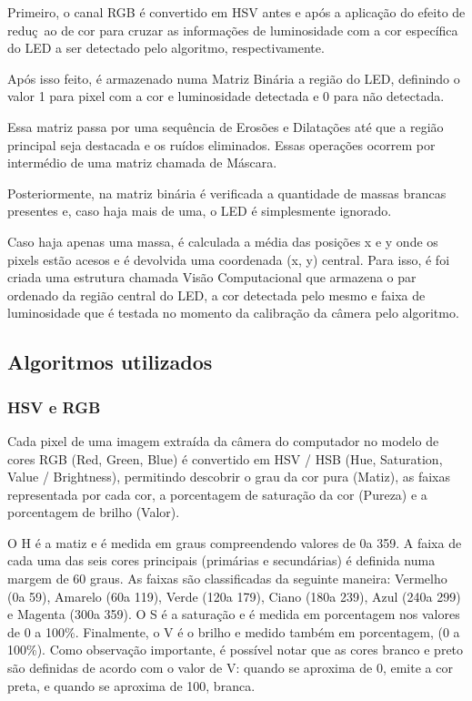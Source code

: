 \documentclass[12pt]{article}
\begin{document}
Primeiro, o canal RGB \'e convertido em HSV antes e ap\'os a aplica\c c\~ao do efeito de redu\c c~ao de cor para
cruzar as informa\c c\~oes de luminosidade com a cor espec\'ifica do LED a ser detectado pelo algoritmo, respectivamente.

Ap\'os isso feito, \'e armazenado numa Matriz Bin\'aria a regi\~ao do LED, definindo o valor 1 para pixel com
a cor e luminosidade detectada e 0 para n\~ao detectada.

Essa matriz passa por uma sequ\^encia de Eros\~oes e Dilata\c c\~oes at\'e que a regi\~ao principal seja destacada
e os ru\'idos eliminados. Essas opera\c c\~oes ocorrem por interm\'edio de uma matriz chamada de M\'ascara.

Posteriormente, na matriz bin\'aria \'e verificada a quantidade de massas brancas presentes e, caso haja mais de uma,
o LED \'e simplesmente ignorado.

Caso haja apenas uma massa, \'e calculada a m\'edia das posi\c c\~oes x e y onde os pixels est\~ao acesos e \'e devolvida
uma coordenada (x, y) central. Para isso, \'e foi criada uma estrutura chamada Vis\~ao Computacional que armazena
o par ordenado da regi\~ao central do LED, a cor detectada pelo mesmo e faixa de luminosidade que \'e testada no momento
da calibra\c c\~ao da c\^amera pelo algoritmo.

\subsection{Algoritmos utilizados\label{sec:alg}}

\subsubsection{HSV e RGB}
Cada pixel de uma imagem extra\'ida da c\^amera do computador no modelo de cores RGB (Red, Green, Blue) \'e convertido em
HSV / HSB (Hue, Saturation, Value / Brightness), permitindo descobrir o grau da cor pura (Matiz), as faixas representada por cada cor,
a porcentagem de satura\c c\~ao da cor (Pureza) e a porcentagem de brilho (Valor).

O H \'e a matiz e \'e medida em graus compreendendo valores de 0\degree a 359\degree.
A faixa de cada uma das seis cores principais (prim\'arias e secund\'arias) \'e definida numa margem de 60 graus.
As faixas s\~ao classificadas da seguinte maneira: Vermelho (0\degree a 59\degree), Amarelo (60\degree a 119\degree), Verde (120\degree a 179\degree),
Ciano (180\degree a 239\degree), Azul (240\degree a 299\degree) e Magenta (300\degree a 359\degree).
O S \'e a satura\c c\~ao e \'e medida em porcentagem nos valores de 0 a 100\%.
Finalmente, o V \'e o brilho e medido tamb\'em em porcentagem, (0 a 100\%). Como observa\c c\~ao importante, \'e possível notar
que as cores branco e preto s\~ao definidas de acordo com o valor de V: quando se aproxima de 0, emite a cor preta,
e quando se aproxima de 100, branca.
\end{document}

